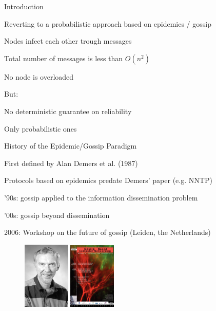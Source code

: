 \begin{frame}{Introduction}
	

\BIL
\item Reverting to a probabilistic approach based on \alert{epidemics} / \alert{gossip}	
\item Nodes \alert{infect} each other trough messages
\item Total number of messages is less than $O(n^2)$
\item No node is overloaded
\EIL

But:

\BIL
\item No deterministic guarantee on reliability
\item Only probabilistic ones
\EIL

\end{frame}

\begin{frame}{History of the Epidemic/Gossip Paradigm}
	
\BIL
\item First defined by Alan Demers et al. (1987)
\item Protocols based on epidemics predate Demers' paper (e.g. NNTP)
\item '90s: gossip applied to the information dissemination problem
\item '00s: gossip beyond dissemination
\item 2006: Workshop on the future of gossip (Leiden, the Netherlands)
\EIL	
	
\begin{figure}
\includegraphics[width=0.20\textwidth]{figs/05/demers}	
\qquad
\includegraphics[width=0.20\textwidth]{figs/05/poster}	
\end{figure}
	
\end{frame}

